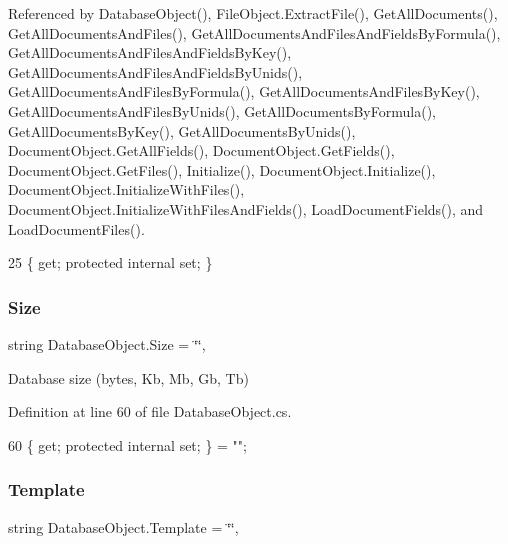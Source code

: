 Referenced by Database\+Object(), File\+Object.\+Extract\+File(), Get\+All\+Documents(), Get\+All\+Documents\+And\+Files(), Get\+All\+Documents\+And\+Files\+And\+Fields\+By\+Formula(), Get\+All\+Documents\+And\+Files\+And\+Fields\+By\+Key(), Get\+All\+Documents\+And\+Files\+And\+Fields\+By\+Unids(), Get\+All\+Documents\+And\+Files\+By\+Formula(), Get\+All\+Documents\+And\+Files\+By\+Key(), Get\+All\+Documents\+And\+Files\+By\+Unids(), Get\+All\+Documents\+By\+Formula(), Get\+All\+Documents\+By\+Key(), Get\+All\+Documents\+By\+Unids(), Document\+Object.\+Get\+All\+Fields(), Document\+Object.\+Get\+Fields(), Document\+Object.\+Get\+Files(), Initialize(), Document\+Object.\+Initialize(), Document\+Object.\+Initialize\+With\+Files(), Document\+Object.\+Initialize\+With\+Files\+And\+Fields(), Load\+Document\+Fields(), and Load\+Document\+Files().


\begin{DoxyCode}
25 \{ \textcolor{keyword}{get}; \textcolor{keyword}{protected} \textcolor{keyword}{internal} \textcolor{keyword}{set}; \}
\end{DoxyCode}
\mbox{\label{class_database_object_ad86f5dd95a9debdef284e21e32936e9e}} 
\subsubsection{\texorpdfstring{Size}{Size}}
{\footnotesize\ttfamily string Database\+Object.\+Size = \char`\"{}\char`\"{}\hspace{0.3cm}{\ttfamily [get]}, {\ttfamily [set]}}



Database size (bytes, Kb, Mb, Gb, Tb) 



Definition at line 60 of file Database\+Object.\+cs.


\begin{DoxyCode}
60 \{ \textcolor{keyword}{get}; \textcolor{keyword}{protected} \textcolor{keyword}{internal} \textcolor{keyword}{set}; \} = \textcolor{stringliteral}{""};
\end{DoxyCode}
\mbox{\label{class_database_object_ac8ecdbe9722c00f787a62aef7d3dfa5a}} 
\subsubsection{\texorpdfstring{Template}{Template}}
{\footnotesize\ttfamily string Database\+Object.\+Template = \char`\"{}\char`\"{}\hspace{0.3cm}{\ttfamily [get]}, {\ttfamily [set]}}



